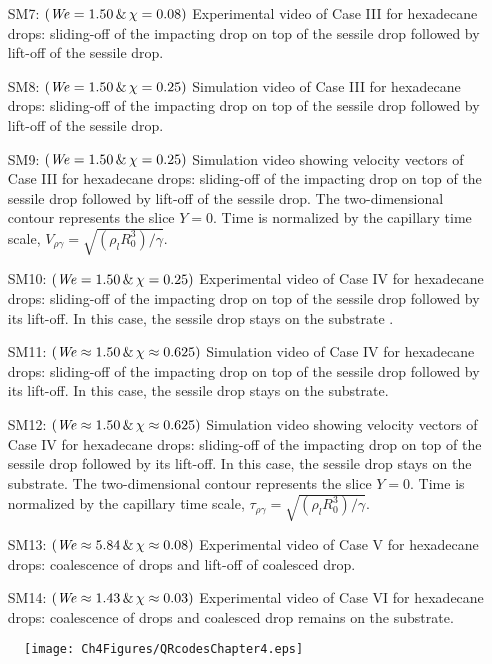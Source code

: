 \begin{subappendices}
\begin{enumerate}
		\item[SM7:] $\left(\mathit{We} = 1.50\,\&\,\chi = 0.08\right)$ Experimental video of Case III for hexadecane drops: sliding-off of the impacting drop on top of the sessile drop followed by lift-off of the sessile drop.
		\item[SM8:] $\left(\mathit{We} = 1.50\,\&\,\chi = 0.25\right)$ Simulation video of Case III for hexadecane drops: sliding-off of the impacting drop on top of the sessile drop followed by lift-off of the sessile drop.
		\item[SM9:] $\left(\mathit{We} = 1.50\,\&\,\chi = 0.25\right)$  Simulation video showing velocity vectors of Case III for hexadecane drops: sliding-off of the impacting drop on top of the sessile drop followed by lift-off of the sessile drop. The two-dimensional contour represents the slice $Y = 0$. Time is normalized by the capillary time scale, $V_{\rho\gamma} = \sqrt{\left(\rho_l R_0^3\right)/\gamma}$.
		
		\item[SM10:] $\left(\mathit{We} = 1.50\,\&\,\chi = 0.25\right)$ Experimental video of Case IV for hexadecane drops: sliding-off of the impacting drop on top of the sessile drop followed by its lift-off. In this case, the sessile drop stays on the substrate .
		\item[SM11:] $\left(\mathit{We} \approx 1.50\,\&\,\chi \approx 0.625\right)$ Simulation video of Case IV for hexadecane drops: sliding-off of the impacting drop on top of the sessile drop followed by its lift-off. In this case, the sessile drop stays on the substrate.
		\item[SM12:] $\left(\mathit{We} \approx 1.50\,\&\,\chi \approx 0.625\right)$ Simulation video showing velocity vectors of Case IV for hexadecane drops: sliding-off of the impacting drop on top of the sessile drop followed by its lift-off. In this case, the sessile drop stays on the substrate. The two-dimensional contour represents the slice $Y = 0$. Time is normalized by the capillary time scale, $\tau_{\rho\gamma} = \sqrt{\left(\rho_l R_0^3\right)/\gamma}$.
		
		\item[SM13:] $\left(\mathit{We} \approx 5.84\,\&\,\chi \approx 0.08\right)$ Experimental video of Case V for hexadecane drops: coalescence of drops and lift-off of coalesced drop.
		\item[SM14:] $\left(\mathit{We} \approx 1.43\,\&\,\chi \approx 0.03\right)$ Experimental video of Case VI for hexadecane drops: coalescence of drops and coalesced drop remains on the substrate.
	\end{enumerate}


\begin{figure*}
	\centering
	\texttt{[image: Ch4Figures/QRcodesChapter4.eps]}
\end{figure*}


\end{subappendices}




